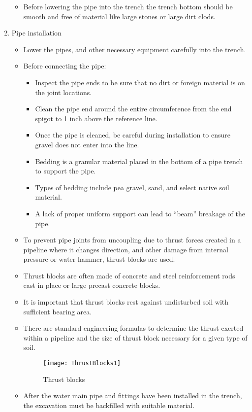 \begin{enumerate}
\begin{itemize}
\item Before lowering the pipe into the trench the trench bottom should be smooth and free of material like large stones or large dirt clods.
\end{itemize}
\item Pipe installation
\begin{itemize}
\item Lower the pipes, and other necessary equipment carefully into the trench.
\item Before connecting the pipe:
\begin{itemize}
  \item Inspect the pipe ends to be sure that no dirt or foreign material is on the joint locations.
  \item Clean the pipe end around the entire circumference from the end spigot to 1 inch above the reference line.
  \item Once the pipe is cleaned, be careful during installation to ensure gravel does not enter into the line.
\item Bedding is a granular material placed in the bottom of a pipe trench to support the pipe. 
\item Types of bedding include pea gravel, sand, and select native soil material.
\item A lack of proper uniform support can lead to “beam” breakage  of the pipe.
\end{itemize}
\item To prevent pipe joints from uncoupling due to thrust forces created in a pipeline where it changes direction, and other damage from internal pressure or water hammer, thrust blocks are used.
\item Thrust blocks are often made of concrete and steel reinforcement rods cast in place or large precast concrete blocks. 
\item It is important that thrust blocks rest against undisturbed soil with sufficient bearing area. 
\item There are standard engineering formulas to determine the thrust exerted within a pipeline and the size of thrust block necessary for a given type of soil.
    \begin{figure}[H]
        \begin{center}
     \texttt{[image: ThrustBlocks1]}
     \caption{Thrust blocks} 
    \end{center}    
    \end{figure}
\item After the water main pipe and fittings have been installed in the trench, the excavation must be backfilled with suitable material.

\end{itemize}
\end{enumerate}
